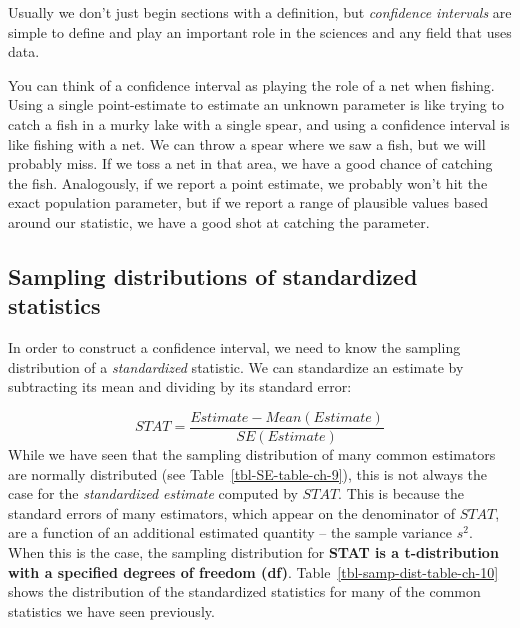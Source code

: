 \documentclass[
  letterpaper,
  DIV=11,
  numbers=noendperiod]{scrreprt}
\theoremstyle{definition}
\theoremstyle{remark}
\begin{document}
Usually we don't just begin sections with a definition, but
\emph{confidence intervals} are simple to define and play an important
role in the sciences and any field that uses data.

You can think of a confidence interval as playing the role of a net when
fishing. Using a single point-estimate to estimate an unknown parameter
is like trying to catch a fish in a murky lake with a single spear, and
using a confidence interval is like fishing with a net. We can throw a
spear where we saw a fish, but we will probably miss. If we toss a net
in that area, we have a good chance of catching the fish. Analogously,
if we report a point estimate, we probably won't hit the exact
population parameter, but if we report a range of plausible values based
around our statistic, we have a good shot at catching the parameter.

\hypertarget{sampling-distributions-of-standardized-statistics}{%
\subsection{Sampling distributions of standardized
statistics}\label{sampling-distributions-of-standardized-statistics}}

In order to construct a confidence interval, we need to know the
sampling distribution of a \emph{standardized} statistic. We can
standardize an estimate by subtracting its mean and dividing by its
standard error:

\[STAT = \frac{Estimate - Mean(Estimate)}{SE(Estimate)}\] While we have
seen that the sampling distribution of many common estimators are
normally distributed (see Table~\ref{tbl-SE-table-ch-9}), this is not
always the case for the \emph{standardized estimate} computed by
\(STAT\). This is because the standard errors of many estimators, which
appear on the denominator of \(STAT\), are a function of an additional
estimated quantity -- the sample variance \(s^2\). When this is the
case, the sampling distribution for \textbf{STAT is a t-distribution
with a specified degrees of freedom (df)}.
Table~\ref{tbl-samp-dist-table-ch-10} shows the distribution of the
standardized statistics for many of the common statistics we have seen
previously.
\end{document}
